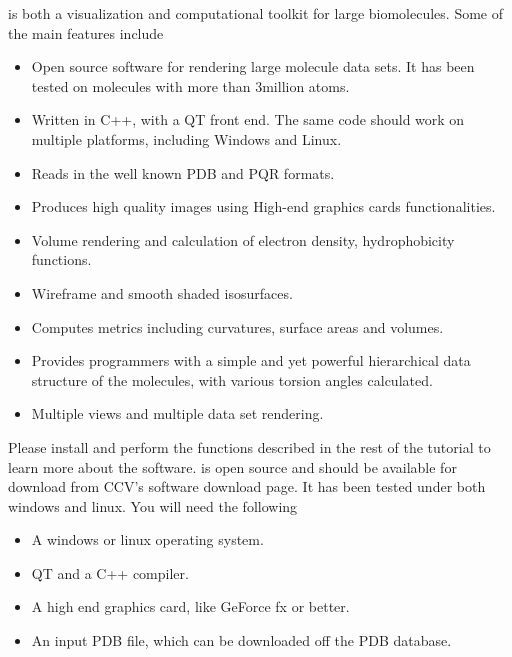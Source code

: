  \TexMol is both a visualization and
computational toolkit for large biomolecules. Some of the main
features include

\begin{itemize}

\item Open source software for rendering large molecule data sets.
It has been tested on molecules with more than 3million atoms.

\item Written in C++, with a QT front end. The same code should work
on multiple platforms, including Windows and Linux.

\item Reads in the well known PDB and PQR formats.

\item Produces high quality images using High-end graphics cards
functionalities.

\item Volume rendering and calculation of electron density,
hydrophobicity functions.

\item Wireframe and smooth shaded isosurfaces.

\item Computes metrics including curvatures, surface areas and
volumes.

\item Provides programmers with a simple and yet powerful hierarchical
data structure of the molecules, with various torsion angles
calculated.

\item Multiple views and multiple data set rendering.

\end{itemize}


Please install \TexMol and perform the functions described in the
rest of the tutorial to learn more about the software. \TexMol is
open source and should be available for download from CCV's software
download page. It has been tested under both windows and linux. You
will need the following

\begin{itemize}

\item A windows or linux operating system.

\item QT and a C++ compiler.

\item A high end graphics card, like GeForce fx or better.

\item An input PDB file, which can be downloaded off the PDB
database.

\end{itemize}

